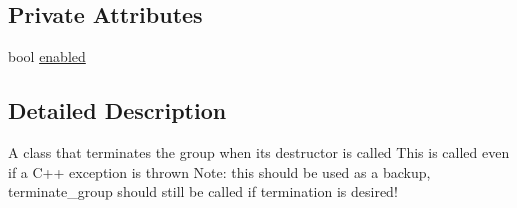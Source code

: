 \subsection*{Private Attributes}
\begin{DoxyCompactItemize}
\item 
bool \hyperlink{class_terminate_on_destruction_a17854fe56e131d017df98b77f9c4cbfc}{enabled}
\end{DoxyCompactItemize}


\subsection{Detailed Description}
A class that terminates the group when its destructor is called This is called even if a C++ exception is thrown Note\-: this should be used as a backup, terminate\-\_\-group should still be called if termination is desired! 

